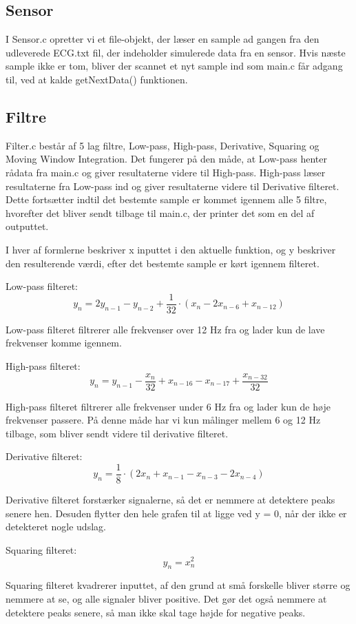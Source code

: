 \documentclass{article}
\begin{document}
\subsection{Sensor}
I Sensor.c opretter vi et file-objekt, der læser en sample ad gangen fra den udleverede ECG.txt fil, der indeholder simulerede data fra en sensor. Hvis næste sample ikke er tom, bliver der scannet et nyt sample ind som main.c får adgang til, ved at kalde getNextData() funktionen.

\subsection{Filtre}
Filter.c består af 5 lag filtre, Low-pass, High-pass, Derivative, Squaring og Moving Window Integration. Det fungerer på den måde, at Low-pass henter rådata fra main.c og giver resultaterne videre til High-pass. High-pass læser resultaterne fra Low-pass ind og giver resultaterne videre til Derivative filteret. Dette fortsætter indtil det bestemte sample er kommet igennem alle 5 filtre, hvorefter det bliver sendt tilbage til main.c, der printer det som en del af outputtet.

I hver af formlerne beskriver x inputtet i den aktuelle funktion, og y beskriver den resulterende værdi, efter det bestemte sample er kørt igennem filteret.

Low-pass filteret:
$$y_n=2y_{n-1}-y_{n-2}+\frac{1}{32}\cdot(x_n-2x_{n-6}+x_{n-12})$$
 
Low-pass filteret filtrerer alle frekvenser over 12 Hz fra og lader kun de lave frekvenser komme igennem.

High-pass filteret:
$$y_n=y_{n-1}-\frac{x_n}{32}+x_{n-16}-x_{n-17}+\frac{x_{n-32}}{32}$$

High-pass filteret filtrerer alle frekvenser under 6 Hz fra og lader kun de høje frekvenser passere. På denne måde har vi kun målinger mellem 6 og 12 Hz tilbage, som bliver sendt videre til derivative filteret.

Derivative filteret:
$$y_n=\frac{1}{8}\cdot(2x_n+x_{n-1}-x_{n-3}-2x_{n-4})$$

Derivative filteret forstærker signalerne, så det er nemmere at detektere peaks senere hen. Desuden flytter den hele grafen til at ligge ved y = 0, når der ikke er detekteret nogle udslag.

Squaring filteret:
$$y_n=x_n^2$$

Squaring filteret kvadrerer inputtet, af den grund at små forskelle bliver større og nemmere at se, og alle signaler bliver positive. Det gør det også nemmere at detektere peaks senere, så man ikke skal tage højde for negative peaks.
\end{document}
